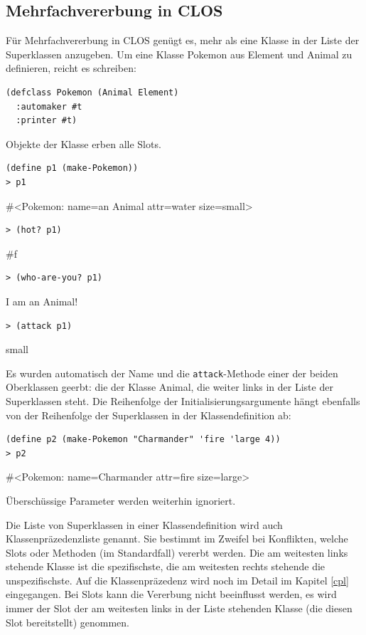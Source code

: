 \subsection{Mehrfachvererbung in CLOS}
Für Mehrfachvererbung in CLOS genügt es, mehr als eine Klasse in der Liste der Superklassen anzugeben. Um eine Klasse Pokemon aus Element und Animal zu definieren, reicht es schreiben:

\begin{lstlisting}
(defclass Pokemon (Animal Element)
  :automaker #t
  :printer #t)
\end{lstlisting}

Objekte der Klasse erben alle Slots.

\begin{lstlisting}
(define p1 (make-Pokemon))
> p1
\end{lstlisting}
{\routput \#<Pokemon: name={\qq}an Animal{\qq} attr=water size=small>}

\begin{lstlisting}
> (hot? p1)
\end{lstlisting}
{\routput \#f}

\begin{lstlisting}
> (who-are-you? p1)
\end{lstlisting}
{\routput {\qq}I am an Animal!\qq}

\begin{lstlisting}
> (attack p1)
\end{lstlisting}
{\rsymbol small}

Es wurden automatisch der Name und die \texttt{attack}-Methode einer der beiden Oberklassen geerbt: die der Klasse Animal, die weiter links in der Liste der Superklassen steht. Die Reihenfolge der Initialisierungsargumente hängt ebenfalls von der Reihenfolge der Superklassen in der Klassendefinition ab:

\begin{lstlisting}
(define p2 (make-Pokemon "Charmander" 'fire 'large 4))
> p2
\end{lstlisting}
{\routput \#<Pokemon: name={\qq}Charmander{\qq} attr=fire size=large>}

Überschüssige Parameter werden weiterhin ignoriert.

Die Liste von Superklassen in einer Klassendefinition wird auch Klassenpräzedenzliste genannt. Sie bestimmt im Zweifel bei Konflikten, welche Slots oder Methoden (im Standardfall) vererbt werden. Die am weitesten links stehende Klasse ist die spezifischste, die am weitesten rechts stehende die unspezifischste. Auf die Klassenpräzedenz wird noch im Detail im Kapitel \ref{cpl} eingegangen. Bei Slots kann die Vererbung nicht beeinflusst werden, es wird immer der Slot der am weitesten links in der Liste stehenden Klasse (die diesen Slot bereitstellt) genommen. 

